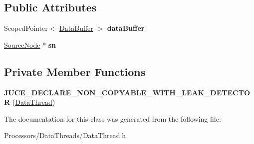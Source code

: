 \subsection*{Public Attributes}
\begin{DoxyCompactItemize}
\item 
\hypertarget{classDataThread_a70d6a9b3496ef57ce2b55a4af6ee8de5}{Scoped\-Pointer$<$ \hyperlink{classDataBuffer}{Data\-Buffer} $>$ {\bfseries data\-Buffer}}\label{classDataThread_a70d6a9b3496ef57ce2b55a4af6ee8de5}

\item 
\hypertarget{classDataThread_a6a26fc244b2ce396c5c013353fb6293e}{\hyperlink{classSourceNode}{Source\-Node} $\ast$ {\bfseries sn}}\label{classDataThread_a6a26fc244b2ce396c5c013353fb6293e}

\end{DoxyCompactItemize}
\subsection*{Private Member Functions}
\begin{DoxyCompactItemize}
\item 
\hypertarget{classDataThread_a86d08fbb9f2ee6534129671959f5de6d}{{\bfseries J\-U\-C\-E\-\_\-\-D\-E\-C\-L\-A\-R\-E\-\_\-\-N\-O\-N\-\_\-\-C\-O\-P\-Y\-A\-B\-L\-E\-\_\-\-W\-I\-T\-H\-\_\-\-L\-E\-A\-K\-\_\-\-D\-E\-T\-E\-C\-T\-O\-R} (\hyperlink{classDataThread}{Data\-Thread})}\label{classDataThread_a86d08fbb9f2ee6534129671959f5de6d}

\end{DoxyCompactItemize}


The documentation for this class was generated from the following file\-:\begin{DoxyCompactItemize}
\item 
Processors/\-Data\-Threads/Data\-Thread.\-h\end{DoxyCompactItemize}
